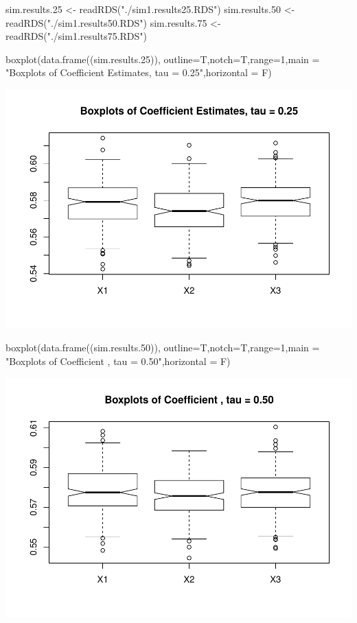 \begin{Schunk}
\begin{Sinput}
sim.results.25 <- readRDS("./sim1.results25.RDS")
sim.results.50 <- readRDS("./sim1.results50.RDS")
sim.results.75 <- readRDS("./sim1.results75.RDS")
\end{Sinput}
\end{Schunk}

\begin{Schunk}
\begin{Sinput}
boxplot(data.frame((sim.results.25)), outline=T,notch=T,range=1,main = "Boxplots of Coefficient Estimates, tau = 0.25",horizontal = F)
\end{Sinput}

\includegraphics{siqr_files/figure-latex/unnamed-chunk-7-1} \end{Schunk}

\begin{Schunk}
\begin{Sinput}
boxplot(data.frame((sim.results.50)), outline=T,notch=T,range=1,main = "Boxplots of Coefficient , tau = 0.50",horizontal = F)
\end{Sinput}

\includegraphics{siqr_files/figure-latex/unnamed-chunk-8-1} \end{Schunk}

